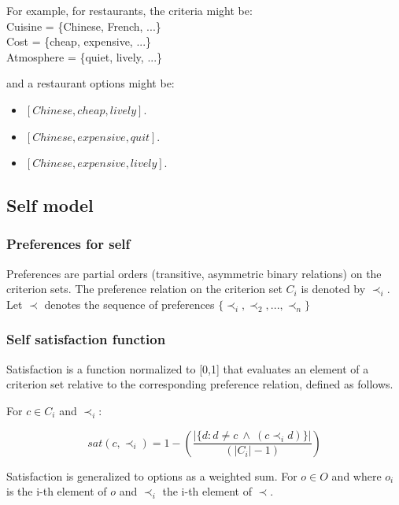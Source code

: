 \documentclass{llncs}
\begin{document}
				For example, for restaurants, the criteria might be: \\
				Cuisine = \{Chinese, French, ...\} \\
				Cost = \{cheap, expensive, ...\} \\
				Atmosphere = \{quiet, lively, ...\} \\
				
				\par and a restaurant options might be: 
				\begin{itemize}
					\item $[Chinese, cheap, lively]$. 
					\item $[Chinese, expensive, quit]$.   
					\item $[Chinese, expensive, lively]$.
				\end{itemize}
				
				
				\subsection{Self model} 
				
				\subsubsection{Preferences for self}
				Preferences are partial orders (transitive, asymmetric binary relations) on the criterion sets. The preference relation on the criterion set $C_i$ is denoted by $\prec_i$.			
				Let $\prec$ denotes the sequence of preferences $\{ \prec_i, \prec_2, ..., \prec_n\}$
				
				\subsubsection{Self satisfaction function} 
				
				Satisfaction is a function normalized to [0,1] that evaluates an element of a criterion set relative to the corresponding preference relation, defined as follows.
				
				For $c \in C_i$ and $\prec_i$:
				
				$$sat(c, \prec_i) =	1 - \left( \frac{|\{d : d \neq c \  \wedge \ (c \prec_i d)\}| }{( |C_i| - 1 )}\right)  $$
				
				Satisfaction is generalized to options as a weighted sum.
				For $o \in O$ and where $o_i$ is the i-th element of $o$ and $\prec_i$ the i-th element of $\prec$.
				
\end{document}
